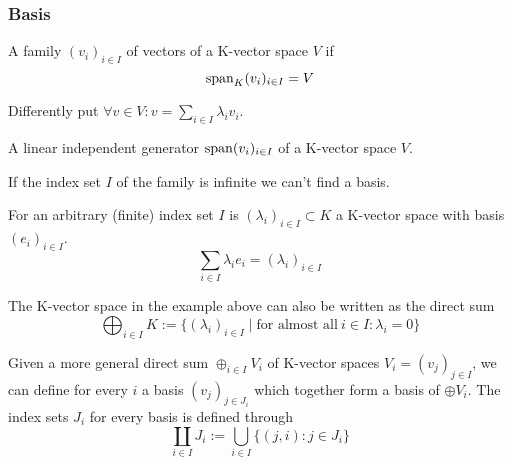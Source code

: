 \subsubsection{Basis}
\begin{definition}[Generator]\label{def:generator}
   A family \((v_i)_{i \in I}\) of vectors of a K-vector space \(V\) if
   \[\operatorname{span}_{K}(v_i)_{i \in I} = V\]
\end{definition}
\begin{remark}
   Differently put \(\forall v \in V: v = \sum_{i \in I} \lambda_i v_i\).
\end{remark}

\begin{definition}[Basis]\label{def:basis}
   A linear independent generator \(\operatorname{span}(v_i)_{i \in I}\) of a K-vector space \(V\).
\end{definition}
\begin{remark}
   If the index set \(I\) of the family is infinite we can't find a basis.
\end{remark}
\begin{example}
   For an arbitrary (finite) index set \(I\) is \((\lambda_i)_{i \in I} \subset K\) a K-vector space with basis \((e_i)_{i \in I}\).
   \[\sum_{i \in I} \lambda_i e_i = (\lambda_i)_{i \in I}\]
\end{example}
\begin{remark}
   The K-vector space in the example above can also be written as the direct sum
   \[\bigoplus_{i \in I} K := \{(\lambda_i)_{i \in I} \mid \text{for almost all}~i \in I: \lambda_i = 0\}\]

   Given a more general direct sum \(\oplus_{i \in I} V_i\) of K-vector spaces \(V_i = (v_j)_{j \in I}\), we can define for every \(i\) a basis \((v_j)_{j \in J_i}\) which together form a basis of \(\oplus V_i\).
   The index sets \(J_i\) for every basis is defined through
   \[\coprod_{i \in I} J_i := \bigcup_{i \in I} \{(j, i): j \in J_i\}\]
\end{remark}

